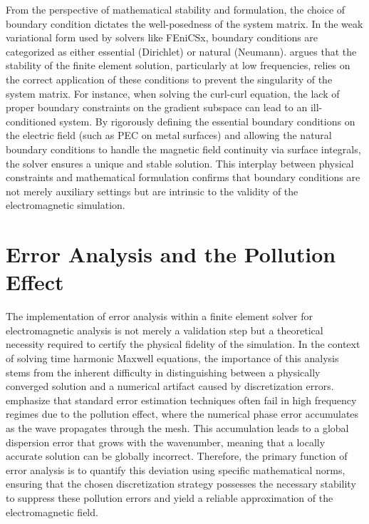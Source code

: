 \documentclass[class=report, crop=false]{standalone}
\begin{document}
From the perspective of mathematical stability and formulation, the choice of boundary condition dictates the well-posedness of the system matrix. In the weak variational form used by solvers like FEniCSx, boundary conditions are categorized as either essential (Dirichlet) or natural (Neumann). \citet{Schwarzbach2009} argues that the stability of the finite element solution, particularly at low frequencies, relies on the correct application of these conditions to prevent the singularity of the system matrix. For instance, when solving the curl-curl equation, the lack of proper boundary constraints on the gradient subspace can lead to an ill-conditioned system. By rigorously defining the essential boundary conditions on the electric field (such as PEC on metal surfaces) and allowing the natural boundary conditions to handle the magnetic field continuity via surface integrals, the solver ensures a unique and stable solution. This interplay between physical constraints and mathematical formulation confirms that boundary conditions are not merely auxiliary settings but are intrinsic to the validity of the electromagnetic simulation.

\section{Error Analysis and the Pollution Effect}

The implementation of error analysis within a finite element solver for electromagnetic analysis is not merely a validation step but a theoretical necessity required to certify the physical fidelity of the simulation. In the context of solving time harmonic Maxwell equations, the importance of this analysis stems from the inherent difficulty in distinguishing between a physically converged solution and a numerical artifact caused by discretization errors. \citet{Melenk2024} emphasize that standard error estimation techniques often fail in high frequency regimes due to the pollution effect, where the numerical phase error accumulates as the wave propagates through the mesh. This accumulation leads to a global dispersion error that grows with the wavenumber, meaning that a locally accurate solution can be globally incorrect. Therefore, the primary function of error analysis is to quantify this deviation using specific mathematical norms, ensuring that the chosen discretization strategy possesses the necessary stability to suppress these pollution errors and yield a reliable approximation of the electromagnetic field.
\end{document}
